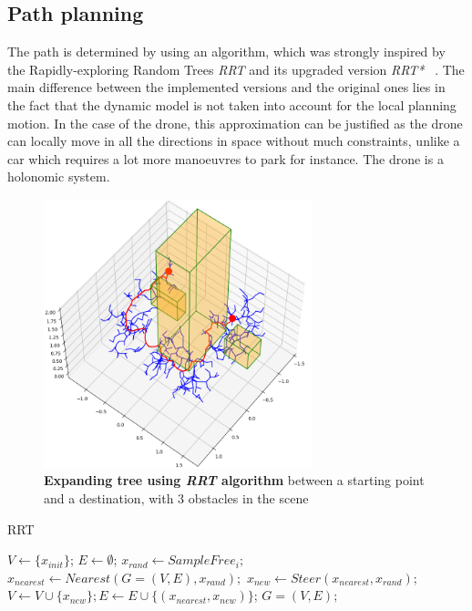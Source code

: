 \documentclass[letterpaper, 10 pt, conference]{ieeeconf}  %
\begin{document}
\subsection{Path planning} 
The path is determined by using an algorithm, which was strongly inspired by the Rapidly-exploring Random Trees \textit{RRT} and its upgraded version \textit{RRT*}~\cite{RRT,3D_RRT} . The main difference between the implemented versions and the original ones lies in the fact that the dynamic model is not taken into account for the local planning motion. In the case of the drone, this approximation can be justified as the drone can locally move in all the directions in space without much constraints, unlike a car which requires a lot more manoeuvres to park for instance. The drone is a holonomic system.

\begin{figure}[h!]
\centering
\includegraphics[width=7.8cm]{rrt.png}
\caption{ \textbf{Expanding tree using \textit{RRT} algorithm} between a starting point and a destination, with 3 obstacles in the scene}
\label{fig:image1}
\end{figure}

\begin{algorithm}
 \caption{RRT \cite{RRT}}\label{alg:RRT}
 \begin{algorithmic}[1]
\State $V \gets \{x_{init}\}$; $E \gets \emptyset$; 
    \State $x_{rand} \gets SampleFree_{i};$
    \State $x_{nearest} \gets Nearest(G = (V,E), x_{rand});$
    \State $x_{new} \gets Steer(x_{nearest}, x_{rand});$
        \State $V \gets V \cup \{x_{new}\}; E \gets E \cup \{ (x_{nearest}, x_{new}) \}$;
    \EndIf
\EndFor
\State \Return $G=(V,E);$
\end{algorithmic}
\end{algorithm}
\end{document}
